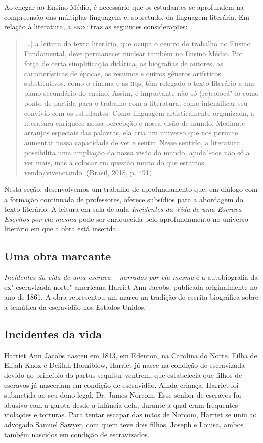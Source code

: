\documentclass[12pt]{extarticle}
\begin{document}
Ao chegar ao Ensino Médio, é necessário que os estudantes se aprofundem
na compreensão das múltiplas linguagens e, sobretudo, da linguagem
literária. Em relação à literatura, a \textsc{bncc} traz as seguintes
considerações:

\begin{quote}
{[}\ldots{}{]} a leitura do texto literário, que ocupa o centro do trabalho
no Ensino Fundamental, deve permanecer nuclear também no Ensino Médio.
Por força de certa simplificação didática, as biografias de autores, as
características de épocas, os resumos e outros gêneros artísticos
substitutivos, como o cinema e as \textsc{hq}s, têm relegado o texto literário a
um plano secundário do ensino. Assim, é importante não só (re)colocá"-lo
como ponto de partida para o trabalho com a literatura, como
intensificar seu convívio com os estudantes. Como linguagem
artisticamente organizada, a literatura enriquece nossa percepção e
nossa visão de mundo. Mediante arranjos especiais das palavras, ela cria
um universo que nos permite aumentar nossa capacidade de ver e sentir.
Nesse sentido, a literatura possibilita uma ampliação da nossa visão do
mundo, ajuda"-nos não só a ver mais, mas a colocar em questão muito do
que estamos vendo/vivenciando. (Brasil, 2018, p. 491)
\end{quote}

Nesta seção, desenvolvemos um trabalho de aprofundamento que, em diálogo
com a formação continuada de professores, oferece subsídios para a
abordagem do texto literário. A leitura em sala de aula \emph{Incidentes
da Vida de uma Escrava - Escritos por ela mesma} pode ser enriquecida
pelo aprofundamento no universo literário em que a obra está inserida.

\subsection{Uma obra marcante}

\emph{Incidentes da vida de uma escrava -- narrados por ela mesma} é a
autobiografia da ex"-escravizada norte"-americana Harriet Ann Jacobs,
publicada originalmente no ano de 1861. A obra representou um marco na
tradição de escrita biográfica sobre a temática da escravidão nos
Estados Unidos.

\subsection{Incidentes da vida}

Harriet Ann Jacobs nasceu em 1813, em Edenton, na Carolina do
Norte. Filha de Elijah Knox e Delilah Horniblow, Harriet já nasce na
condição de escravizada devido ao princípio do partus sequitur ventrem,
que estabelecia que filhos de escravos já nasceriam em condição de
escravidão. Ainda criança, Harriet foi submetida ao seu dono legal, Dr.
James Norcom. Esse senhor de escravos foi abusivo com a garota desde a
infância dela, durante a qual eram frequentes violações e torturas. Para
tentar escapar das mãos de Norcom, Harriet se uniu ao advogado Samuel
Sawyer, com quem teve dois filhos, Joseph e Louisa, ambos também
nascidos em condição de escravizados.
\end{document}
